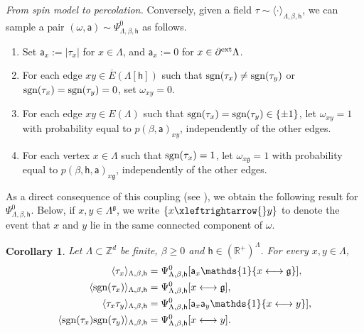 \documentclass[11pt,a4paper]{article}
\numberwithin{equation}{section}
\theoremstyle{plain}
\newtheorem{Coro}[Thm]{Corollary}
\theoremstyle{definition}
\newcommand{\connect}{\xleftrightarrow}
\newcommand\fg{\mathfrak{g}}
\begin{document}
\medskip 
\noindent \textit{From spin model to percolation.} Conversely, given a field $\tau\sim \langle \cdot \rangle_{\Lambda,\beta,\mathsf{h}}$, we can sample a pair $(\omega, \mathsf{a})\sim \Psi^0_{\Lambda,\beta,\mathsf{h}}$ as follows. 
\begin{enumerate}
\item[$(i)$] Set $\mathsf{a}_x:=|\tau_x|$ for $x\in\Lambda$, and $\mathsf{a}_x:=0$ 
for $x\in\partial^{\textup{ext}}\Lambda$.
\item[$(ii)$] For each edge $xy\in \overline{E}(\Lambda[\mathsf{h}])$ such that $\textup{sgn}(\tau_x) \neq \textup{sgn}(\tau_y)$ or $\textup{sgn}(\tau_x)=\textup{sgn}(\tau_y)=0$, set $\omega_{xy}=0$. 
\item[$(iii)$] For each edge $xy\in E(\Lambda)$ such that $\textup{sgn}(\tau_x) = \textup{sgn}(\tau_y) \in \{\pm 1\}$, let $\omega_{xy}=1$ with probability equal to $p(\beta, \mathsf{a})_{xy}$, independently of  the other edges.
\item[$(iv)$] For each vertex $x\in \Lambda$ such that $\textup{sgn}(\tau_x) = 1$, let $\omega_{x\mathfrak g}=1$
with probability equal to $p(\beta,\mathsf{h}, \mathsf{a})_{x\fg}$, independently of the other edges.
\end{enumerate}

As a direct consequence of this coupling (see \cite[Theorem 1.16]{Grimmett2006RCM}), we obtain the following result for $\Psi^0_{\Lambda,\beta,\mathsf{h}}$.
Below, if $x,y\in \Lambda^\fg$, we write $\{x\connect{} y\}$ to denote the event that $x$ and $y$ lie in the same connected component of $\omega$.


\begin{Coro} \label{cor: ES correlations}
Let $\Lambda\subset \mathbb Z^d$ be finite, $\beta\geq 0$ and $\mathsf h \in (\mathbb R^+)^\Lambda$. For every $x,y\in \Lambda$, 
\begin{align}
\label{eq: es cor: 1}
\langle \tau_x \rangle_{\Lambda,\beta,\mathsf{h}}
&=
\Psi^0_{\Lambda,\beta,\mathsf{h}}[\mathsf{a}_x \mathds{1}\{x\longleftrightarrow \fg\}], 
\\
\label{eq: es cor: 2}
\langle \textup{sgn}(\tau_x) \rangle_{\Lambda,\beta,\mathsf{h}}
&=
\Psi^0_{\Lambda,\beta,\mathsf{h}}[x\longleftrightarrow \fg], 
\\ \label{eq: es cor: 3}
\langle \tau_x \tau_y \rangle_{\Lambda,\beta,\mathsf{h}}
&=
\Psi^0_{\Lambda,\beta,\mathsf{h}}[\mathsf{a}_x \mathsf{a}_y \mathds{1}\{x\longleftrightarrow y\}], 
\\ \label{eq: es cor: 4}
\langle \textup{sgn}(\tau_x) \textup{sgn}(\tau_y) \rangle_{\Lambda,\beta,\mathsf{h}}
&=
\Psi^0_{\Lambda,\beta,\mathsf{h}}[x\longleftrightarrow y]. 
\end{align}   
\end{Coro}
\end{document}
